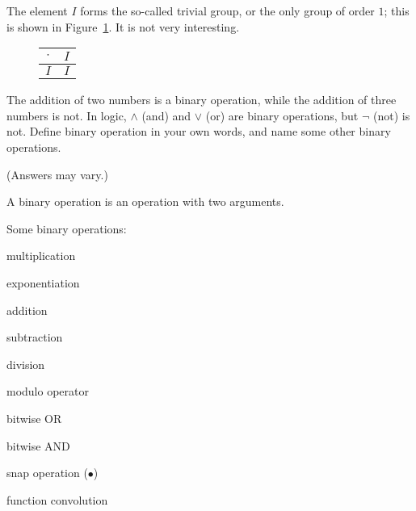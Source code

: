 \documentclass[../gatm_answers.tex]{subfiles}
\begin{document}
\noindent The element $I$ forms the so-called trivial group, or the only group of order $1$; this is shown in Figure~\ref{fig:trivial_group}. It is not very interesting.

\begin{figure}[h]
	\begin{center}
		\begin{minipage}[b]{\textwidth}
			\centering
			\begin{tabular}{c|c}
				\hline
				$\cdot$ & $I$ \\ \hline
				\rowcolor{light-gray}
				$I$ & $I$ \\ \hline
			\end{tabular}
			\vspace*{0.5\baselineskip}
		\end{minipage}
	\end{center}
	\vspace*{-2\baselineskip}
	\begin{center}
		\begin{minipage}[t]{\textwidth}
			\label{fig:trivial_group}
		\end{minipage}
	\end{center}
	\vspace*{-2\baselineskip}
\end{figure}

\begin{outer_problem}
\item The addition of two numbers is a binary operation, while the addition of three numbers is not. In logic, $\land$ (and) and $\lor$ (or) are binary operations, but $\lnot$ (not) is not. Define binary operation in your own words, and name some other binary operations.
\end{outer_problem}

\noindent (Answers may vary.)

A binary operation is an operation with two arguments.

Some binary operations:
\begin{enumerate}
\begin{multicols}{4}
\item multiplication
\item exponentiation
\item addition
\item subtraction
\item division
\item modulo operator
\item bitwise OR
\item bitwise AND
\item snap operation ($\bullet$)
\item function convolution
\end{multicols}
\end{enumerate}
\end{document}

